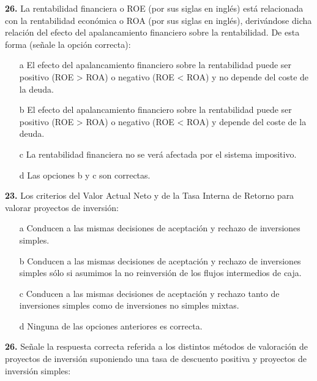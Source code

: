 \documentclass{nuevotema}
\begin{document}
\graficas

\conceptos

\preguntas


\textbf{26.} La rentabilidad financiera o ROE (por sus siglas en inglés) está relacionada con la rentabilidad económica o ROA (por sus siglas en inglés), derivándose dicha relación del efecto del apalancamiento financiero sobre la rentabilidad. De esta forma (señale la opción correcta):

\begin{itemize}
	\item[a] El efecto del apalancamiento financiero sobre la rentabilidad puede ser positivo (ROE > ROA) o negativo (ROE < ROA) y no depende del coste de la deuda.
	\item[b] El efecto del apalancamiento financiero sobre la rentabilidad puede ser positivo (ROE > ROA) o negativo (ROE < ROA) y depende del coste de la deuda.
	\item[c] La rentabilidad financiera no se verá afectada por el sistema impositivo.
	\item[d] Las opciones b y c son correctas.
\end{itemize}



\textbf{23.} Los criterios del Valor Actual Neto y de la Tasa Interna de Retorno para valorar proyectos de inversión:

\begin{itemize}
	\item[a] Conducen a las mismas decisiones de aceptación y rechazo de inversiones simples.
	\item[b] Conducen a las mismas decisiones de aceptación y rechazo de inversiones simples sólo si asumimos la no reinversión de los flujos intermedios de caja.
	\item[c] Conducen a las mismas decisiones de aceptación y rechazo tanto de inversiones simples como de inversiones no simples mixtas.
	\item[d] Ninguna de las opciones anteriores es correcta.
\end{itemize}


\textbf{26.} Señale la respuesta correcta referida a los distintos métodos de valoración de proyectos de inversión suponiendo una tasa de descuento positiva y proyectos de inversión simples:
\end{document}
